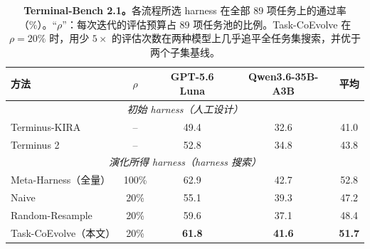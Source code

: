 \begin{table}[t]
\centering
\caption{\textbf{Terminal-Bench 2.1。}各流程所选 harness 在全部 89 项任务上的通过率（\%）。``$\rho$''：每次迭代的评估预算占 89 项任务池的比例。Task-CoEvolve 在 $\rho{=}20\%$ 时，用少 $5\times$ 的评估次数在两种模型上几乎追平全任务集搜索，并优于两个子集基线。}
\label{table:tb2_results}
\small
\setlength{\tabcolsep}{6pt}
\begin{tabular}{lcccc}
\toprule
\textbf{方法} & {\boldmath$\rho$} & \textbf{GPT-5.6 Luna} & \textbf{Qwen3.6-35B-A3B} & \textbf{平均} \\
\midrule
\multicolumn{5}{c}{\textit{初始 harness（人工设计）}} \\
\midrule
Terminus-KIRA & -- & 49.4 & 32.6 & 41.0 \\
Terminus 2 & -- & 52.8 & 34.8 & 43.8 \\
\midrule[\heavyrulewidth]
\multicolumn{5}{c}{\textit{演化所得 harness（harness 搜索）}} \\
\midrule
Meta-Harness（全量） & 100\% & 62.9 & 42.7 & 52.8 \\
\midrule
Naive & 20\% & 55.1 & 39.3 & 47.2 \\
Random-Resample & 20\% & 59.6 & 37.1 & 48.4 \\
Task-CoEvolve（本文） & 20\% & \textbf{61.8} & \textbf{41.6} & \textbf{51.7} \\
\bottomrule
\end{tabular}
\end{table}
